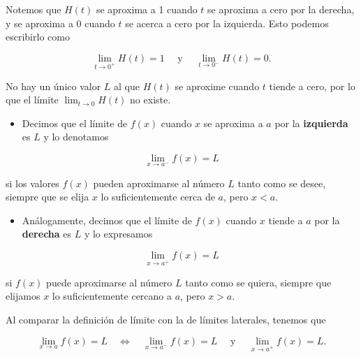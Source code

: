 \documentclass[
  letterpaper,
]{book}
\providecommand{\tightlist}{%
  \setlength{\itemsep}{0pt}\setlength{\parskip}{0pt}}
\theoremstyle{plain}
\theoremstyle{remark}
\begin{document}
Notemos que \(H(t)\) se aproxima a 1 cuando \(t\) se aproxima a cero por
la derecha, y se aproxima a 0 cuando \(t\) se acerca a cero por la
izquierda. Esto podemos escribirlo como

\[
\lim_{t\to 0^+} H(t)=1 \quad \text{ y } \quad \lim_{t\to 0^-} H(t)=0.
\]

No hay un único valor \(L\) al que \(H(t)\) se aproxime cuando \(t\)
tiende a cero, por lo que el límite \(\lim_{t\to 0} H(t)\) no existe.

\begin{tcolorbox}[enhanced jigsaw, opacityback=0, left=2mm, opacitybacktitle=0.6, toprule=.15mm, bottomrule=.15mm, colbacktitle=quarto-callout-note-color!10!white, titlerule=0mm, bottomtitle=1mm, title=\textcolor{quarto-callout-note-color}{\faInfo}\hspace{0.5em}{Definición (Límites laterales)}, toptitle=1mm, colframe=quarto-callout-note-color-frame, colback=white, breakable, rightrule=.15mm, arc=.35mm, leftrule=.75mm, coltitle=black]

\begin{itemize}
\tightlist
\item
  Decimos que el límite de \(f(x)\) cuando \(x\) se aproxima a \(a\) por
  la \textbf{izquierda} es \(L\) y lo denotamos
\end{itemize}

\[
\lim_{x\to a^-} f(x)=L
\]

si los valores \(f(x)\) pueden aproximarse al número \(L\) tanto como se
desee, siempre que se elija \(x\) lo suficientemente cerca de \(a\),
pero \textbf{\(x<a\)}.

\begin{itemize}
\tightlist
\item
  Análogamente, decimos que el límite de \(f(x)\) cuando \(x\) tiende a
  \(a\) por la \textbf{derecha} es \(L\) y lo expresamos
\end{itemize}

\[
\lim_{x\to a^+} f(x)=L
\]

si \(f(x)\) puede aproximarse al número \(L\) tanto como se quiera,
siempre que elijamos \(x\) lo suficientemente cercano a \(a\), pero
\textbf{\(x>a\)}.

\end{tcolorbox}

Al comparar la definición de límite con la de límites laterales, tenemos
que

\[
\lim_{x\to a} f(x)=L \quad \Longleftrightarrow \quad \lim_{x\to a^-} f(x)=L \quad \text{ y } \quad \lim_{x\to a^+} f(x)=L.
\]
\end{document}
